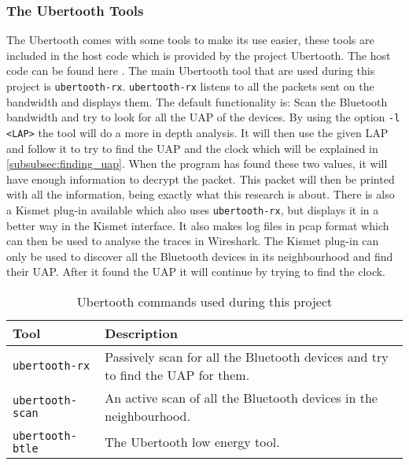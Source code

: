 \subsubsection{The Ubertooth Tools}
\label{subsubsec:ubertooth_tools}
The Ubertooth comes with some tools to make its use easier, these tools are included in the host code which is provided by the project Ubertooth. The host code can be found here \cite{hostcode}.
The main Ubertooth tool that are used during this project is \verb|ubertooth-rx|. \verb|ubertooth-rx| listens to all the packets sent on the bandwidth and displays them. The default functionality is: Scan the Bluetooth bandwidth and try to look for all the UAP of the devices. By using the option \verb|-l <LAP>| the tool will do a more in depth analysis. It will then use the given LAP and follow it to try to find the UAP and the clock which will be explained in \ref{subsubsec:finding_uap}. When the program has found these two values, it will have enough information to decrypt the packet. This packet will then be printed with all the information, being exactly what this research is about. \pend There is also a Kismet plug-in available which also uses \verb|ubertooth-rx|, but displays it in a better way in the Kismet interface. It also makes log files in pcap format which can then be used to analyse the traces in Wireshark. The Kismet plug-in can only be used to discover all the Bluetooth devices in its neighbourhood and find their UAP. After it found the UAP it will continue by trying to find the clock.

\begin{table}[!h]
\begin{tabular}{|l|l|}
\hline
Tool & Description \\
\hline
\verb|ubertooth-rx| & Passively scan for all the Bluetooth devices and try to find the UAP for them. \\
\hline
\verb|ubertooth-scan| & An active scan of all the Bluetooth devices in the neighbourhood.  \\
\hline
\verb|ubertooth-btle| & The Ubertooth low energy tool. \\
\hline
\end{tabular}
\caption{Ubertooth commands used during this project}
\label{tab:ubertooth_tools}
\end{table}
